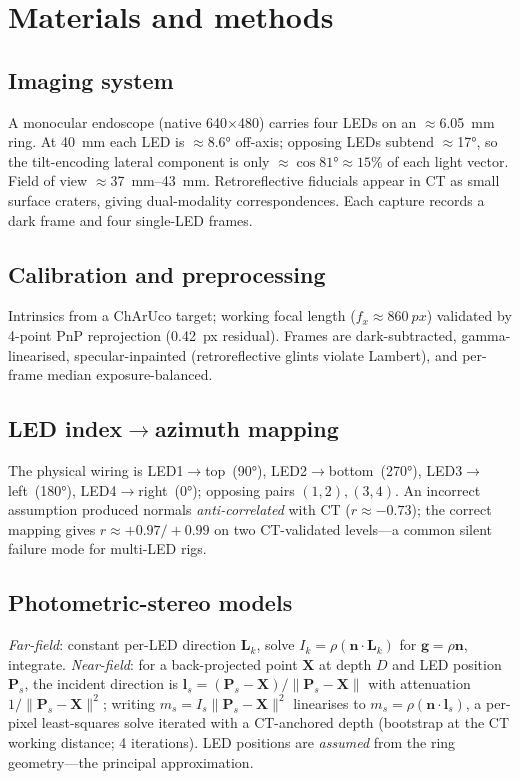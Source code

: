 \documentclass[11pt]{article}
\begin{document}
\section{Materials and methods}
\subsection{Imaging system}
A monocular endoscope (native \num{640}$\times$\num{480}) carries four LEDs on an
$\approx$\SI{6.05}{\mm} ring. At \SI{40}{\mm} each LED is $\approx$\ang{8.6}
off-axis; opposing LEDs subtend $\approx$\ang{17}, so the tilt-encoding lateral
component is only $\approx\cos\ang{81}\approx15\%$ of each light vector. Field of
view $\approx$\SIrange{37}{43}{\mm}. Retroreflective fiducials appear in CT as small
surface craters, giving dual-modality correspondences. Each capture records a dark
frame and four single-LED frames.

\subsection{Calibration and preprocessing}
Intrinsics from a ChArUco target; working focal length ($f_x\approx\SI{860}{px}$)
validated by 4-point PnP reprojection (\SI{0.42}{px} residual). Frames are
dark-subtracted, gamma-linearised, specular-inpainted (retroreflective glints
violate Lambert), and per-frame median exposure-balanced.

\subsection{LED index$\to$azimuth mapping}
The physical wiring is LED1$\to$top~(\ang{90}), LED2$\to$bottom~(\ang{270}),
LED3$\to$left~(\ang{180}), LED4$\to$right~(\ang{0}); opposing pairs $(1,2),(3,4)$.
An incorrect assumption produced normals \emph{anti-correlated} with CT
($r\approx-0.73$); the correct mapping gives $r\approx+0.97/+0.99$ on two
CT-validated levels---a common silent failure mode for multi-LED rigs.

\subsection{Photometric-stereo models}
\emph{Far-field}: constant per-LED direction $\mathbf L_k$, solve
$I_k=\rho(\mathbf n\!\cdot\!\mathbf L_k)$ for $\mathbf g=\rho\mathbf n$, integrate.
\emph{Near-field}: for a back-projected point $\mathbf X$ at depth $D$ and LED
position $\mathbf P_s$, the incident direction is
$\mathbf l_s=(\mathbf P_s-\mathbf X)/\lVert\mathbf P_s-\mathbf X\rVert$ with
attenuation $1/\lVert\mathbf P_s-\mathbf X\rVert^2$; writing
$m_s=I_s\lVert\mathbf P_s-\mathbf X\rVert^2$ linearises to
$m_s=\rho(\mathbf n\!\cdot\!\mathbf l_s)$, a per-pixel least-squares solve iterated
with a CT-anchored depth (bootstrap at the CT working distance; 4 iterations). LED
positions are \emph{assumed} from the ring geometry---the principal approximation.
\end{document}
